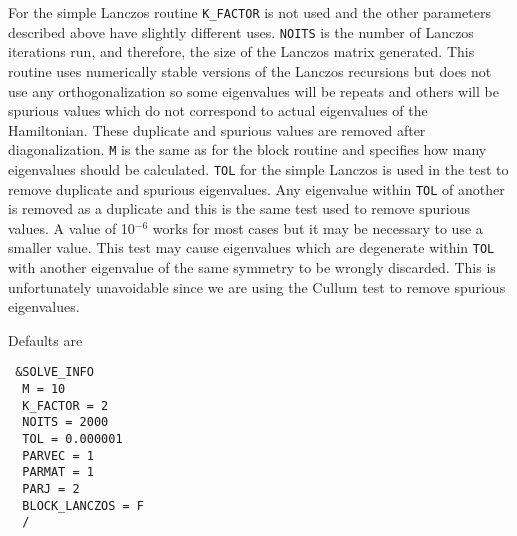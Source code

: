 \documentclass{article}
\begin{document}
For the simple Lanczos routine {\tt K\_FACTOR} is not used and the other parameters described above
have slightly different uses. {\tt NOITS} is the number of Lanczos iterations run, and therefore, the
size of the Lanczos matrix generated. This routine uses numerically stable versions of the Lanczos recursions\cite{cullum} but does not use any orthogonalization so some
eigenvalues will be repeats and others will be spurious values which do not correspond to actual
eigenvalues of the Hamiltonian. These duplicate and spurious values are removed after diagonalization. {\tt M} is the same as for the block routine and specifies how many eigenvalues should be calculated. {\tt TOL} for the simple Lanczos is used
in the test to remove duplicate and spurious eigenvalues. Any eigenvalue within {\tt TOL} of another
is removed as a duplicate and this is the same test used to remove spurious values. A value
of 10$^{-6}$ works for most cases but it may be necessary to use a smaller value. This test may cause eigenvalues which are degenerate within {\tt TOL} with another eigenvalue of the same symmetry to be wrongly discarded. This is unfortunately unavoidable since we are using the Cullum test to remove spurious eigenvalues.

Defaults are

\begin{verbatim}
 &SOLVE_INFO
  M = 10
  K_FACTOR = 2
  NOITS = 2000
  TOL = 0.000001
  PARVEC = 1
  PARMAT = 1
  PARJ = 2
  BLOCK_LANCZOS = F
  /
\end{verbatim}
\end{document}
